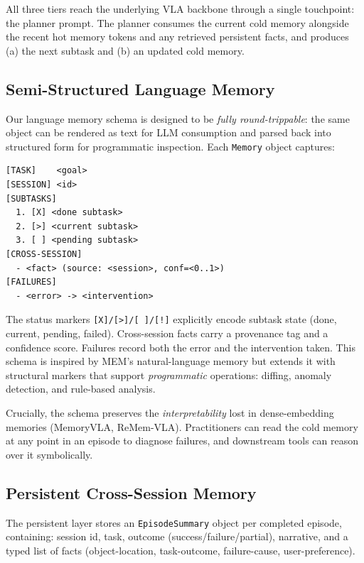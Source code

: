 All three tiers reach the underlying VLA backbone through a single
touchpoint: the planner prompt. The planner consumes the current
cold memory alongside the recent hot memory tokens and any retrieved
persistent facts, and produces (a) the next subtask and (b) an
updated cold memory.

\subsection{Semi-Structured Language Memory}
\label{sec:method:lang}

Our language memory schema is designed to be \emph{fully
round-trippable}: the same object can be rendered as text for LLM
consumption and parsed back into structured form for programmatic
inspection. Each \texttt{Memory} object captures:

{\small
\begin{verbatim}
[TASK]    <goal>
[SESSION] <id>
[SUBTASKS]
  1. [X] <done subtask>
  2. [>] <current subtask>
  3. [ ] <pending subtask>
[CROSS-SESSION]
  - <fact> (source: <session>, conf=<0..1>)
[FAILURES]
  - <error> -> <intervention>
\end{verbatim}
}

The status markers \texttt{[X]/[>]/[\,]/[!]} explicitly encode
subtask state (done, current, pending, failed). Cross-session facts
carry a provenance tag and a confidence score. Failures record both
the error and the intervention taken. This schema is inspired by
MEM's natural-language memory \cite{mem} but extends it with
structural markers that support \emph{programmatic} operations:
diffing, anomaly detection, and rule-based analysis.

Crucially, the schema preserves the \emph{interpretability} lost in
dense-embedding memories (MemoryVLA, ReMem-VLA). Practitioners can
read the cold memory at any point in an episode to diagnose
failures, and downstream tools can reason over it symbolically.

\subsection{Persistent Cross-Session Memory}
\label{sec:method:persistent}

The persistent layer stores an \texttt{EpisodeSummary} object per
completed episode, containing: session id, task, outcome
(success/failure/partial), narrative, and a typed list of facts
(object-location, task-outcome, failure-cause, user-preference).

